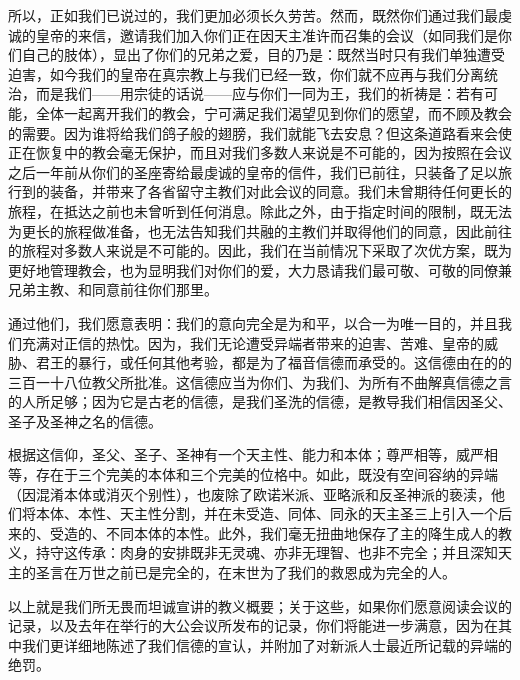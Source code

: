 所以，正如我们已说过的，我们更加必须长久劳苦。然而，既然你们通过我们最虔诚的皇帝的来信，邀请我们加入你们正在因天主准许而召集的会议（如同我们是你们自己的肢体），显出了你们的兄弟之爱，目的乃是：既然当时只有我们单独遭受迫害，如今我们的皇帝在真宗教上与我们已经一致，你们就不应再与我们分离统治，而是我们——用宗徒的话说——应与你们一同为王，我们的祈祷是：若有可能，全体一起离开我们的教会，宁可满足我们渴望见到你们的愿望，而不顾及教会的需要。因为谁将给我们鸽子般的翅膀，我们就能飞去安息？但这条道路看来会使正在恢复中的教会毫无保护，而且对我们多数人来说是不可能的，因为按照在会议之后一年前从你们的圣座寄给最虔诚的皇帝的信件，我们已前往，只装备了足以旅行到的装备，并带来了各省留守主教们对此会议的同意。我们未曾期待任何更长的旅程，在抵达之前也未曾听到任何消息。除此之外，由于指定时间的限制，既无法为更长的旅程做准备，也无法告知我们共融的主教们并取得他们的同意，因此前往的旅程对多数人来说是不可能的。因此，我们在当前情况下采取了次优方案，既为更好地管理教会，也为显明我们对你们的爱，大力恳请我们最可敬、可敬的同僚兼兄弟主教、和同意前往你们那里。\par

通过他们，我们愿意表明：我们的意向完全是为和平，以合一为唯一目的，并且我们充满对正信的热忱。因为，我们无论遭受异端者带来的迫害、苦难、皇帝的威胁、君王的暴行，或任何其他考验，都是为了福音信德而承受的。这信德由在的的三百一十八位教父所批准。这信德应当为你们、为我们、为所有不曲解真信德之言的人所足够；因为它是古老的信德，是我们圣洗的信德，是教导我们相信因圣父、圣子及圣神之名的信德。\par

根据这信仰，圣父、圣子、圣神有一个天主性、能力和本体；尊严相等，威严相等，存在于三个完美的本体和三个完美的位格中。如此，既没有空间容纳的异端（因混淆本体或消灭个别性），也废除了欧诺米派、亚略派和反圣神派的亵渎，他们将本体、本性、天主性分割，并在未受造、同体、同永的天主圣三上引入一个后来的、受造的、不同本体的本性。此外，我们毫无扭曲地保存了主的降生成人的教义，持守这传承：肉身的安排既非无灵魂、亦非无理智、也非不完全；并且深知天主的圣言在万世之前已是完全的，在末世为了我们的救恩成为完全的人。\par

以上就是我们所无畏而坦诚宣讲的教义概要；关于这些，如果你们愿意阅读会议的记录，以及去年在举行的大公会议所发布的记录，你们将能进一步满意，因为在其中我们更详细地陈述了我们信德的宣认，并附加了对新派人士最近所记载的异端的绝罚。\par

